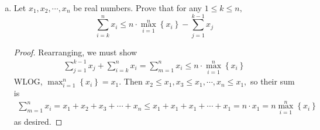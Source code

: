 \documentclass{article}
\begin{document}
\begin{enumerate}[(a)]
		\newpage
	\item Let $x_1, x_2, \cdots, x_n$ be real numbers. Prove that for any $1\le k\le n,$
		\[\sum_{i=k}^{n} x_i\le n\cdot\max_{i=1}^n \left\{ x_i \right\} - \sum_{j=1}^{k-1} x_j\]
		\begin{proof}
			Rearranging, we must show
			\begin{align*}
				\sum_{j=1}^{k-1}x_j + \sum_{i=k}^{n} x_i = \sum_{m=1}^{n} x_i\le n\cdot \max_{i=1}^n\left\{ x_i \right\}
			\end{align*}
			WLOG, $\max_{i=1}^n\left\{ x_i \right\} = x_1.$ Then $x_2\le x_1, x_3\le x_1, \cdots, x_n\le x_1,$ so their sum is
			\begin{align*}
				\sum_{m=1}^{n} x_i = x_1+x_2+x_3+\cdots+x_n\le x_1+x_1+x_1+\cdots+x_1 = n\cdot x_1 = n\max_{i=1}^n \left\{ x_i \right\}
			\end{align*}
			as desired.
		\end{proof}

\end{enumerate}
\end{document}
